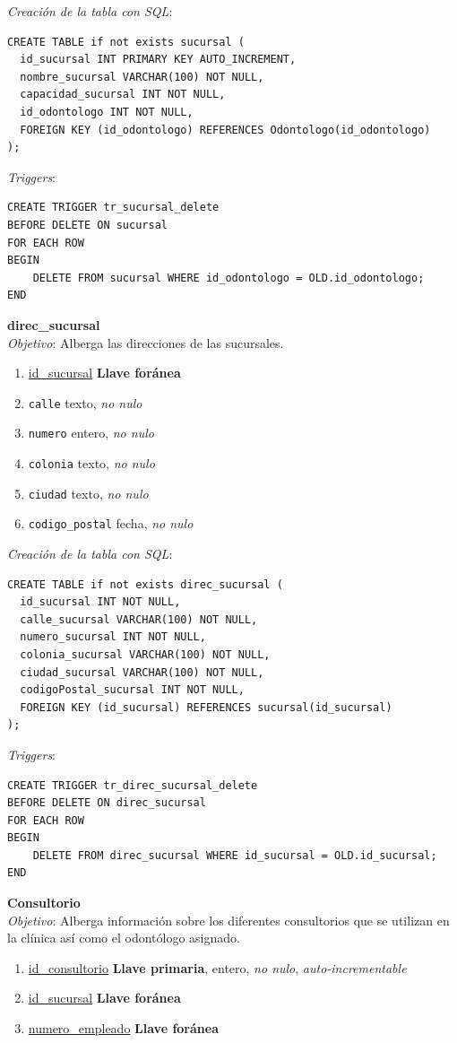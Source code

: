 \documentclass[a4paper,12pt]{article}
\begin{document}
\emph{Creación de la tabla con SQL}: 
\begin{verbatim}
CREATE TABLE if not exists sucursal (
  id_sucursal INT PRIMARY KEY AUTO_INCREMENT,
  nombre_sucursal VARCHAR(100) NOT NULL,
  capacidad_sucursal INT NOT NULL,
  id_odontologo INT NOT NULL,
  FOREIGN KEY (id_odontologo) REFERENCES Odontologo(id_odontologo)
);
\end{verbatim}

\emph{Triggers}:

\begin{verbatim}
CREATE TRIGGER tr_sucursal_delete
BEFORE DELETE ON sucursal
FOR EACH ROW
BEGIN
    DELETE FROM sucursal WHERE id_odontologo = OLD.id_odontologo;
END
\end{verbatim}

\textbf{direc\_sucursal} \\ \emph{Objetivo}: Alberga las direcciones de las sucursales.
\begin{enumerate}
	\item \underline{id\_sucursal} \textbf{Llave foránea}
	\item \texttt{calle} texto, \emph{no nulo}
	\item \texttt{numero} entero, \emph{no nulo}
	\item \texttt{colonia} texto, \emph{no nulo}
	\item \texttt{ciudad} texto, \emph{no nulo}
	\item \texttt{codigo\_postal} fecha, \emph{no nulo}
\end{enumerate}

\emph{Creación de la tabla con SQL}: 
\begin{verbatim}
CREATE TABLE if not exists direc_sucursal (
  id_sucursal INT NOT NULL,
  calle_sucursal VARCHAR(100) NOT NULL,
  numero_sucursal INT NOT NULL,
  colonia_sucursal VARCHAR(100) NOT NULL,
  ciudad_sucursal VARCHAR(100) NOT NULL,
  codigoPostal_sucursal INT NOT NULL,
  FOREIGN KEY (id_sucursal) REFERENCES sucursal(id_sucursal)
);
\end{verbatim}

\emph{Triggers}: 

\begin{verbatim}
CREATE TRIGGER tr_direc_sucursal_delete
BEFORE DELETE ON direc_sucursal
FOR EACH ROW
BEGIN
    DELETE FROM direc_sucursal WHERE id_sucursal = OLD.id_sucursal;
END
\end{verbatim}


\textbf{Consultorio} \\ \emph{Objetivo}: Alberga información sobre los diferentes consultorios que se utilizan en la clínica así como el odontólogo asignado.
\begin{enumerate}
	\item \underline{id\_consultorio} \textbf{Llave primaria}, entero, \emph{no nulo}, \textit{auto-incrementable}
	\item \underline{id\_sucursal} \textbf{Llave foránea}
	\item \underline{numero\_empleado} \textbf{Llave foránea}
\end{enumerate}
\end{document}
